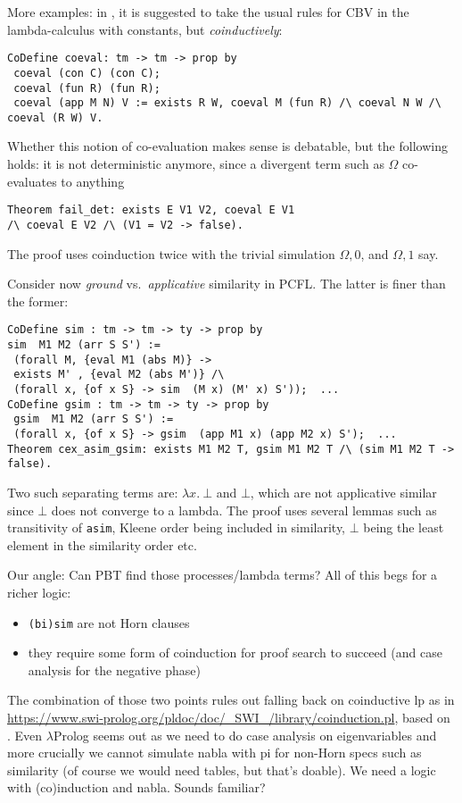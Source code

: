 \documentclass[sigconf]{acmart}
\begin{document}
More examples: in \cite{2007-Leroy-Grall}, it is suggested to take the usual rules for CBV in the lambda-calculus with constants, but \emph{coinductively}:
\begin{lstlisting}
CoDefine coeval: tm -> tm -> prop by
 coeval (con C) (con C);
 coeval (fun R) (fun R);
 coeval (app M N) V := exists R W, coeval M (fun R) /\ coeval N W /\ coeval (R W) V.
\end{lstlisting}

Whether this notion of co-evaluation makes sense is debatable, but the
following holds: it is not deterministic anymore, since a divergent
term such as $\Omega$ co-evaluates to anything
\begin{lstlisting}
Theorem fail_det: exists E V1 V2, coeval E V1
/\ coeval E V2 /\ (V1 = V2 -> false).
\end{lstlisting}
The proof uses coinduction twice with the trivial simulation
$\Omega,0$, and $\Omega, 1$ say.
%

Consider now \emph{ground} vs.\ \emph{applicative} similarity in
PCFL. The latter is finer than the former:

\begin{lstlisting}
CoDefine sim : tm -> tm -> ty -> prop by
sim  M1 M2 (arr S S') :=
 (forall M, {eval M1 (abs M)} -> 
 exists M' , {eval M2 (abs M')} /\ 
 (forall x, {of x S} -> sim  (M x) (M' x) S'));  ...
CoDefine gsim : tm -> tm -> ty -> prop by
 gsim  M1 M2 (arr S S') :=
 (forall x, {of x S} -> gsim  (app M1 x) (app M2 x) S');  ...
Theorem cex_asim_gsim: exists M1 M2 T, gsim M1 M2 T /\ (sim M1 M2 T -> false).
\end{lstlisting}
Two such separating terms are: $\lambda x.\ \bot$ and $\bot$, which
are not applicative similar since $\bot$ does not converge to a
lambda. The proof uses several lemmas such as transitivity of
\texttt{asim}, Kleene order being included in similarity, $\bot$ being
the least element in the similarity order etc.

Our angle: Can PBT find those processes/lambda terms?
All of this begs for a richer logic:
\begin{itemize}
\item   \texttt{(bi)sim} are not Horn clauses
\item they require some form of coinduction for proof search to succeed (and case analysis for the negative phase)
\end{itemize}

The combination of those two points rules out falling back on
coinductive lp as in
\url{https://www.swi-prolog.org/pldoc/doc/_SWI_/library/coinduction.pl},
based on \cite{Luke07}. Even $\lambda$Prolog seems out as we need to
do case analysis on eigenvariables and more crucially we cannot
simulate nabla with pi for non-Horn specs such as similarity (of
course we would need tables, but that's doable). We need a logic with
(co)induction and nabla. Sounds familiar?
\end{document}
